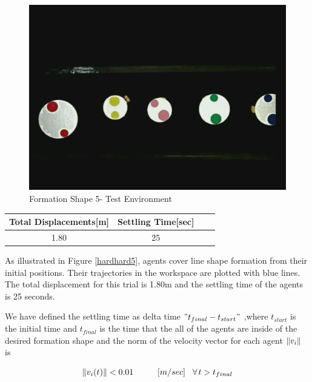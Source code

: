 \begin{figure}[H]
\caption{Formation Shape 5- Test Environment}
\centerline{\includegraphics[scale = 0.35]{9_real_hardware}}
\end{figure} 
					
\begin{center}
 \label{hardwareshape5_ref} 
\begin{tabular}{||c| c |c |c ||}
\hline
\textbf{Total Displacements[m]}  & \textbf{Settling Time[sec]}\\ 
\hline
1.80 & 25 \\
\hline
\end{tabular}
\end{center}

As illustrated in Figure \ref{hardhard5}, agents cover line shape formation from their initial positions. Their trajectories in the workspace are plotted with blue lines. The total displacement for this trial is 1.80m and the settling time of the agents is 25 seconds.	

We have defined the settling time as delta time $"t_{final} - t_{start}"$ ,where $t_{start}$ is the initial time and $t_{final}$ is the time that the all of the agents are inside of the desired formation shape and the norm of the velocity vector for each agent $\left\lVert v_i\right\rVert$ is

\begin{equation}
\left\lVert v_i(t)\right\rVert < 0.01 \hspace{1.0cm} [m/sec] \hspace{0.3cm}\forall\hspace{0.05cm} t>t_{final}
\end{equation}

